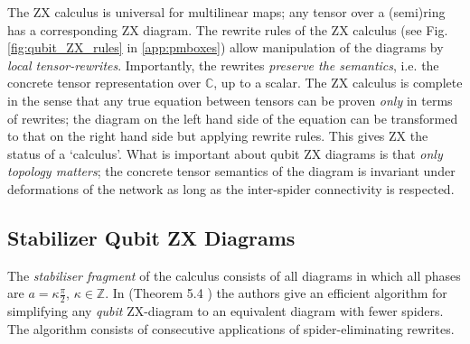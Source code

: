 \documentclass[submission,copyright,creativecommons]{eptcs}
\begin{document}
The ZX calculus is universal for multilinear maps;
any tensor over a (semi)ring has a corresponding ZX diagram.
The rewrite rules of the ZX calculus (see Fig.\ref{fig:qubit_ZX_rules} in \ref{app:pmboxes}) allow manipulation of the diagrams by \emph{local tensor-rewrites}. Importantly, the rewrites \emph{preserve the semantics}, i.e. the concrete tensor representation over $\mathbb{C}$, up to a scalar.
The ZX calculus is complete in the sense that any true equation between tensors can be proven \emph{only} in terms of rewrites;
the diagram on the left hand side of the equation can be transformed to that on the right hand side but applying rewrite rules.
This gives ZX the status of a `calculus'. 
What is important about qubit ZX diagrams
is that \emph{only topology matters};
the concrete tensor semantics of the diagram is invariant under
deformations of the network as long as the inter-spider connectivity is respected.


\subsection{Stabilizer Qubit ZX Diagrams}

The \textit{stabiliser fragment} of the calculus consists of all diagrams in which all phases are $a=\kappa \frac{\pi}{2}$, $\kappa\in\mathbb{Z}$.
In (Theorem 5.4 \cite{graph_theoretic_simplification}) the authors give an efficient algorithm for simplifying any \emph{qubit} ZX-diagram to an equivalent diagram with fewer spiders.
The algorithm consists of consecutive applications of spider-eliminating rewrites.
\end{document}
